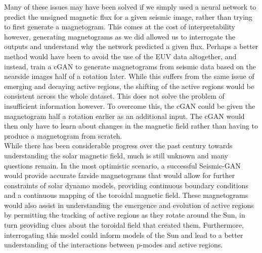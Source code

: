 \documentclass[11pt,a4paper,onecolumn]{report}
\begin{document}
Many of these issues may have been solved if we simply used a neural network to
predict the unsigned magnetic flux for a given seismic image, rather than trying
to first generate a magnetogram. This comes at the cost of interpretability
however, generating magnetograms as we did allowed us to interrogate the outputs
and understand why the network predicted a given flux. Perhaps a better method
would have been to avoid the use of the EUV data altogether, and instead, train
a cGAN to generate magnetograms from seismic data based on the nearside images
half of a rotation later. While this suffers from the same issue of emerging and
decaying active regions, the shifting of the active regions would be consistent
across the whole dataset. This does not solve the problem of insufficient
information however. To overcome this, the cGAN could be given the magnetogram
half a rotation earlier as an additional input. The cGAN would then only have to
learn about changes in the magnetic field rather than having to produce a
magnetogram from scratch. \\


While there has been considerable progress over the past century towards
understanding the solar magnetic field, much is still unknown and many questions
remain. In the most optimistic scenario, a successful Seismic-GAN would provide
accurate farside magnetograms that would allow for further constraints of solar
dynamo models, providing continuous boundary conditions and a continuous mapping
of the toroidal magnetic field. These magnetograms would also assist in
understanding the emergence and evolution of active regions by permitting the
tracking of active regions as they rotate around the Sun, in turn providing
clues about the toroidal field that created them. Furthermore, interrogating
this model could inform models of the Sun and lead to a better understanding of
the interactions between p-modes and active regions.

\end{document}
